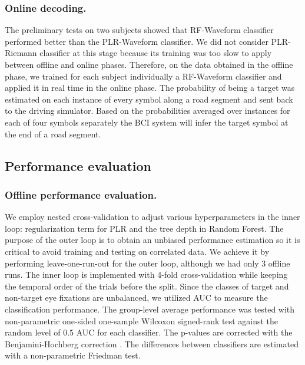 \documentclass[12pt]{iopart}
\begin{document}
\subsubsection*{Online decoding.}
The preliminary tests on two subjects showed that RF-Waveform classifier
performed better than the PLR-Waveform classifier. We did not consider
PLR-Riemann classifier at this stage because its training
was too slow to apply between offline and online phases.
Therefore, on the data obtained in the offline phase, we trained for each subject individually a RF-Waveform classifier
and applied it in real time in the online phase.
The probability of being a target was estimated on each instance of every symbol along a road segment and sent back to the driving simulator. Based on the probabilities averaged over instances for each of four symbols separately the BCI system will infer the target symbol at the end of a road segment.


\subsection{Performance evaluation}

\subsubsection*{Offline performance evaluation.}
We employ nested cross-validation to adjust various hyperparameters in the inner loop:
regularization term for PLR and the tree depth in Random Forest.
The purpose of the outer loop is to obtain an unbiased performance estimation
so it is critical to avoid training and testing on correlated data.
We achieve it by performing leave-one-run-out for the outer loop,
although we had only 3 offline runs.
The inner loop is implemented with 4-fold cross-validation while keeping
the temporal order of the trials before the split.
Since the classes of target and non-target eye fixations are unbalanced,
we utilized AUC to measure the classification performance.
The group-level average performance was tested with non-parametric one-sided one-sample Wilcoxon signed-rank test against the random level of 0.5 AUC for each classifier.
The p-values are corrected with 
the Benjamini-Hochberg correction \cite{benjamini_controlling_1995}.
The differences between classifiers are estimated with a non-parametric Friedman test.
\end{document}
